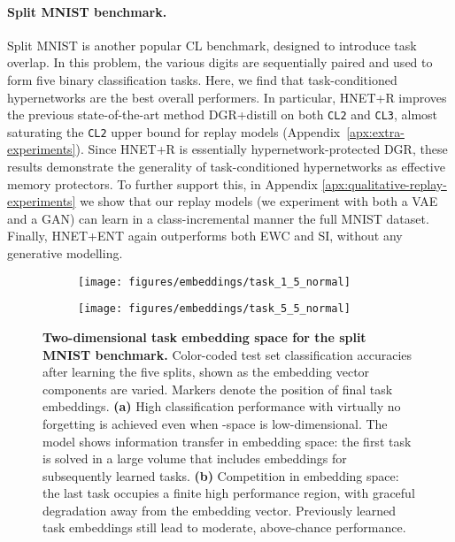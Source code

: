 \documentclass{article}
\begin{document}
\paragraph{Split MNIST benchmark.} Split MNIST is another popular CL benchmark, designed to introduce task overlap. In this problem, the various digits are sequentially paired and used to form five binary classification tasks. Here, we find that task-conditioned hypernetworks are the best overall performers. In particular, HNET+R improves the previous state-of-the-art method DGR+distill on both \texttt{CL2} and \texttt{CL3}, almost saturating the \texttt{CL2} upper bound for replay models (Appendix~\ref{apx:extra-experiments}). Since HNET+R is essentially hypernetwork-protected DGR, these results demonstrate the generality of task-conditioned hypernetworks as effective memory protectors. To further support this, in Appendix \ref{apx:qualitative-replay-experiments} we show that our replay models (we experiment with both a VAE and a GAN) can learn in a class-incremental manner the full MNIST dataset. Finally, HNET+ENT again outperforms both EWC and SI, without any generative modelling.

\begin{figure}
    \centering
    \begin{subfigure}{0.42\linewidth}
    \caption{}
    \texttt{[image: figures/embeddings/task\_1\_5\_normal]}
    \end{subfigure}
    \begin{subfigure}{0.42\linewidth}
    \caption{}
    \texttt{[image: figures/embeddings/task\_5\_5\_normal]}
    \end{subfigure}
    \caption{\textbf{Two-dimensional task embedding space for the split MNIST benchmark.} Color-coded test set classification accuracies after learning the five splits, shown as the embedding vector components are varied. Markers denote the position of final task embeddings. \textbf{(a)} High classification performance with virtually no forgetting is achieved even when -space is low-dimensional. The model shows information transfer in embedding space: the first task is solved in a large volume that includes embeddings for subsequently learned tasks. \textbf{(b)} Competition in embedding space: the last task occupies a finite high performance region, with graceful degradation away from the embedding vector. Previously learned task embeddings still lead to moderate, above-chance performance.\vspace{-2mm} \label{fig:2D-embeddings}}
\vspace{-2mm}
\end{figure}
\end{document}

